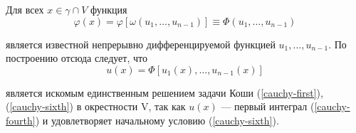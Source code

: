 \par Для всех $x \in \gamma \cap V$ функция
$$\varphi(x)=\varphi[\omega(u_1, \ldots, u_{n-1})] \equiv \Phi(u_1, \ldots, u_{n-1})$$
\par является известной непрерывно дифференцируемой функцией $u_1, \ldots, u_{n-1}$. По построению отсюда следует, что
$$u(x)=\Phi[u_1(x), \ldots, u_{n-1}(x)]$$
\par является искомым единственным решением задачи Коши (\ref{cauchy-first}), (\ref{cauchy-sixth}) в окрестности V, так как $u(x)$ — первый интеграл (\ref{cauchy-fourth}) и удовлетворяет начальному условию (\ref{cauchy-sixth}). \EndProof
